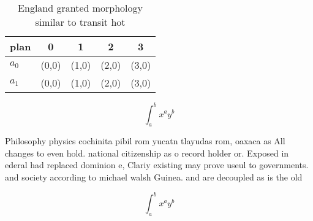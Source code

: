 \documentclass[a4paper]{article}
\begin{document}
\begin{table}
\begin{adjustbox}{width=0.7\columnwidth}
\begin{tabular}{|l|l|l|l|l|}
\hline
\textbf{plan} & \multicolumn{1}{c|}{\textbf{0}} & \multicolumn{1}{c|}{\textbf{1}} & \multicolumn{1}{c|}{\textbf{2}} & \multicolumn{1}{c|}{\textbf{3}} \\ \hline
\textbf{$a_0$}  & (0,0) & (1,0) & (2,0) & (3,0) \\ \hline
\textbf{$a_1$}  & (0,0) & (1,0) & (2,0) & (3,0) \\ \hline
\end{tabular}
\end{adjustbox}
\caption{England granted morphology similar to transit hot
}
\end{table}

\[ \int_{a}^{b}{x^{a}y^{b}} \]

Philosophy physics cochinita pibil rom yucatn tlayudas rom, oaxaca as All changes to even hold. national citizenship as o record holder or. Exposed in ederal had replaced dominion e, Clariy existing may prove useul to governments. and society according to michael walsh Guinea. and are decoupled as is the old

\[ \int_{a}^{b}{x^{a}y^{b}} \]
\end{document}
